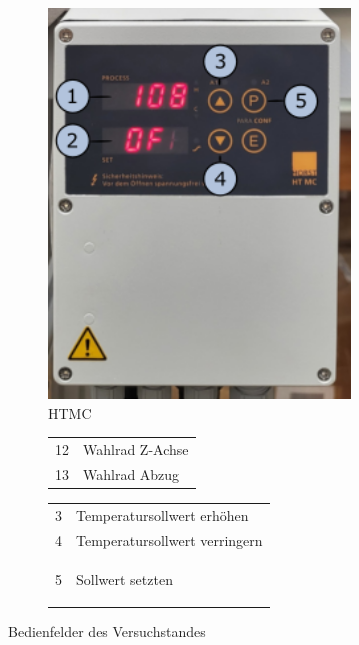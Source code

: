 \begin{figure}[!h]
\begin{subfigure}[]{.45\textwidth}
        \centering
        \includegraphics[width=0.88\textwidth]{Abbildungen/Manuel/Interface_02.png}
        \caption{HTMC}
        \label{fig:HTMC}
    \end{subfigure}
    \begin{subfigure}[]{.45\textwidth}
        \centering
        \begin{tabular}{c|l}
        
               12    & Wahlrad Z-Achse \\
               13    & Wahlrad Abzug 
        \label{tab:interface}     
        \end{tabular}
        
        
    \end{subfigure}
    \begin{subfigure}[]{.45\textwidth}
    \centering
        \begin{tabular}{c|l}
               3    & Temperatursollwert erhöhen\\
               4    & Temperatursollwert verringern \\
               5    & Sollwert setzten
            
        \label{tab:HTMC}      
        \end{tabular}
        
    \end{subfigure}
    \caption{Bedienfelder des Versuchstandes}
    \label{fig:bedienfelder}  
\end{figure}

